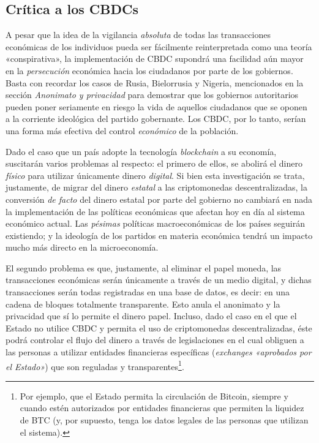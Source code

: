 \documentclass[12pt,a4paper,twoside]{book}
\begin{document}
\subsection{Crítica a los CBDCs}
A pesar que la idea de la vigilancia \textit{absoluta} de todas las transacciones económicas de los individuos pueda ser fácilmente reinterpretada como una teoría «conspirativa», la implementación de CBDC supondrá una facilidad aún mayor en la \textit{persecución} económica hacia los ciudadanos por parte de los gobiernos. Basta con recordar los casos de Rusia, Bielorrusia y Nigeria, mencionados en la sección \textit{Anonimato y privacidad} para demostrar que los gobiernos autoritarios pueden poner seriamente en riesgo la vida de aquellos ciudadanos que se oponen a la corriente ideológica del partido gobernante. Los CBDC, por lo tanto, serían una forma más efectiva del control \textit{económico} de la población.

Dado el caso que un país adopte la tecnología \textit{blockchain} a su economía, suscitarán varios problemas al respecto: el primero de ellos, se abolirá el dinero \textit{físico} para utilizar únicamente dinero \textit{digital}. Si bien esta investigación se trata, justamente, de migrar del dinero \textit{estatal} a las criptomonedas descentralizadas, la conversión \textit{de facto} del dinero estatal por parte del gobierno no cambiará en nada la implementación de las políticas económicas que afectan hoy en día al sistema económico actual. Las \textit{pésimas} políticas macroeconómicas de los países seguirán existiendo; y la ideología de los partidos en materia económica tendrá un impacto mucho más directo en la microeconomía.

El segundo problema es que, justamente, al eliminar el papel moneda, las transacciones económicas serán únicamente a través de un medio digital, y dichas transacciones serán todas registradas en una base de datos, es decir: en una cadena de bloques totalmente transparente. Esto anula el anonimato y la privacidad que sí lo permite el dinero papel. Incluso, dado el caso en el que el Estado no utilice CBDC y permita el uso de criptomonedas descentralizadas, éste podrá controlar el flujo del dinero a través de legislaciones en el cual obliguen a las personas a utilizar entidades financieras específicas (\textit{exchanges «aprobados por el Estado»}) que son reguladas y transparentes\footnote{Por ejemplo, que el Estado permita la circulación de Bitcoin, siempre y cuando estén autorizados por entidades financieras que permiten la liquidez de BTC (y, por supuesto, tenga los datos legales de las personas que utilizan el sistema).}.
\end{document}
